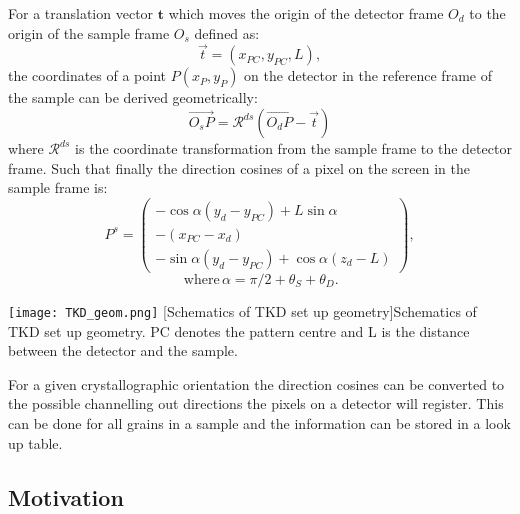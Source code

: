 \noindent \begin{minipage}{0.5\textwidth}
\vspace{0.5cm}
For a translation vector $\textbf{t}$ which moves the origin of the detector frame $O_d$ to the origin of the sample frame $O_s$ defined as:
\begin{equation*}
    \vec{t}=(x_{PC}, y_{PC}, L),
\end{equation*}
the coordinates of a point $P(x_P, y_P)$ on the detector in the reference frame of the sample can be derived geometrically:
\begin{equation*}
   \vec{O_sP} = \mathcal{R}^{ds}(\vec{O_dP} -\vec{t})
\end{equation*}
where   $\mathcal{R}^{ds}$    is the coordinate transformation from the sample frame to the detector frame. Such that finally the direction cosines of a pixel on the screen in the sample frame is:
\begin{equation*}
    P^s=\begin{pmatrix}
    -\cos{\alpha}(y_d-y_{PC}) + L \sin{\alpha}   \\
    -(x_{PC}-x_d)\\
    -\sin{\alpha}(y_d-y_{PC}) + \cos{\alpha}(z_d-L)  
    \end{pmatrix}, 
\end{equation*}
\begin{equation*}
     \, \text{where} \,\alpha =\pi/2 + \theta_S + \theta_D.   
\end{equation*}    
\end{minipage}
\begin{minipage}{0.5\textwidth}
    \centering
\texttt{[image: TKD\_geom.png]}
[Schematics of TKD set up geometry]{Schematics of TKD set up geometry. PC denotes the pattern centre and L is the distance between the detector and the sample.} 
\label{fig:geometries}
\end{minipage}

\vspace{0.3cm}


For a given crystallographic orientation the direction cosines can be converted to the possible channelling out directions the pixels on a detector will register. This can be done for all grains in a sample and the information  can be stored in a look up table.






\subsection{Motivation}
\label{sec:introduction}


